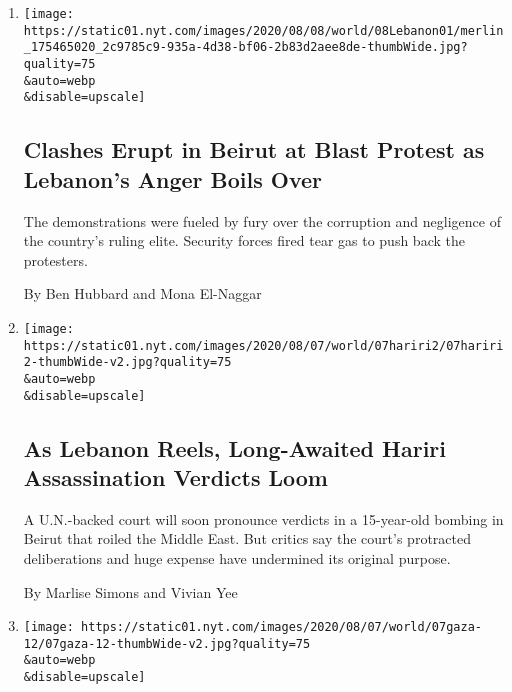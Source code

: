 \begin{enumerate}
\def\labelenumi{\arabic{enumi}.}
\item
  \href{/2020/08/08/world/middleeast/Beirut-explosion-protests-lebanon.html}{}

  \texttt{[image: https://static01.nyt.com/images/2020/08/08/world/08Lebanon01/merlin\_175465020\_2c9785c9-935a-4d38-bf06-2b83d2aee8de-thumbWide.jpg?quality=75\\\&auto=webp\\\&disable=upscale]}

  \hypertarget{clashes-erupt-in-beirut-at-blast-protest-as-lebanons-anger-boils-over}{%
  \subsection{Clashes Erupt in Beirut at Blast Protest as Lebanon's
  Anger Boils
  Over}\label{clashes-erupt-in-beirut-at-blast-protest-as-lebanons-anger-boils-over}}

  The demonstrations were fueled by fury over the corruption and
  negligence of the country's ruling elite. Security forces fired tear
  gas to push back the protesters.

  By Ben Hubbard and Mona El-Naggar
\item
  \href{/2020/08/08/world/middleeast/hariri-assassination-trial-hague.html}{}

  \texttt{[image: https://static01.nyt.com/images/2020/08/07/world/07hariri2/07hariri2-thumbWide-v2.jpg?quality=75\\\&auto=webp\\\&disable=upscale]}

  \hypertarget{as-lebanon-reels-long-awaited-hariri-assassination-verdicts-loom}{%
  \subsection{As Lebanon Reels, Long-Awaited Hariri Assassination
  Verdicts
  Loom}\label{as-lebanon-reels-long-awaited-hariri-assassination-verdicts-loom}}

  A U.N.-backed court will soon pronounce verdicts in a 15-year-old
  bombing in Beirut that roiled the Middle East. But critics say the
  court's protracted deliberations and huge expense have undermined its
  original purpose.

  By Marlise Simons and Vivian Yee
\item
  \href{/2020/08/08/world/middleeast/coronavirus-gaza.html}{}

  \texttt{[image: https://static01.nyt.com/images/2020/08/07/world/07gaza-12/07gaza-12-thumbWide-v2.jpg?quality=75\\\&auto=webp\\\&disable=upscale]}


\end{enumerate}
